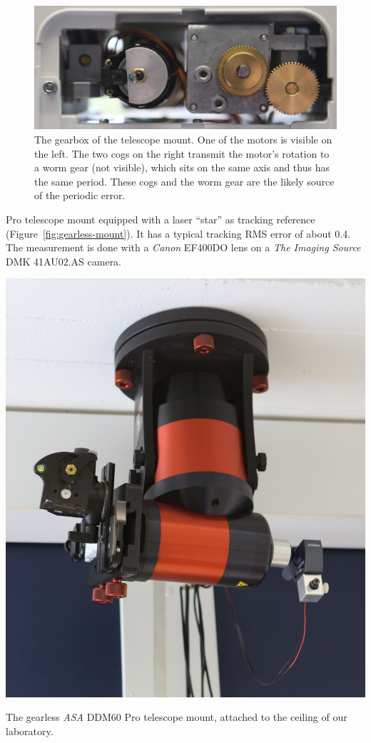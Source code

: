 \begin{figure}
\centering%
\footnotesize%
  \includegraphics[width=\columnwidth]{img/gearbox_1200.jpg}%
  \caption[The gearbox of the telescope mount.]{The gearbox of the telescope
mount. One of the motors is visible on the left. The two cogs on the right
transmit the motor's rotation to a worm gear (not visible), which sits on the
same axis and thus has the same period. These cogs and the worm gear are the
likely
source of the periodic error.}%
  \label{fig:gearbox}%
\end{figure}

\noindent Pro telescope mount equipped
with a laser ``star'' as tracking reference (Figure~\ref{fig:gearless-mount}).
It has a typical tracking RMS error of about 0.4\as. The measurement is done
with a \emph{Canon} EF400DO lens on a \emph{The Imaging Source} DMK
41AU02.AS camera.

\begin{marginfigure}[3cm]
\centering%
\footnotesize%
  \includegraphics[width=\columnwidth]{img/mount_ceiling_1200.jpg}%
  \caption[The gearless \emph{ASA} DDM60 Pro telescope mount.]{The gearless
\emph{ASA} DDM60 Pro telescope mount, attached to the ceiling of our
laboratory.}%
  \label{fig:gearless-mount}%
\end{marginfigure}

